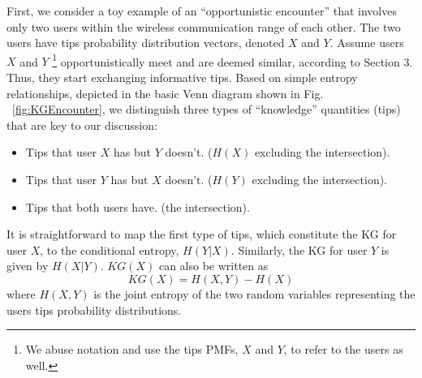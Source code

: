 \documentclass[conference]{IEEEtran}
\theoremstyle{definition}
\begin{document}
First, we consider a toy example of an ``opportunistic encounter'' that involves only two users within the wireless communication range of each other. The two users have tips probability distribution vectors, denoted $X$ and $Y$. Assume users $X$ and $Y$ \footnote{We abuse notation and use the tips PMFs, $X$ and $Y$, to refer to the users as well.} opportunistically meet and are deemed similar, according to Section 3. Thus, they start exchanging informative tips. Based on simple entropy relationships, depicted in the basic Venn diagram shown in Fig. ~\ref{fig:KGEncounter}, we distinguish three types of ``knowledge'' quantities (tips) that are key to our discussion: 
%
\begin{itemize}
\vspace{-0.2 cm}
\item Tips that user $X$ has but $Y$ doesn't. ($H(X)$ excluding the intersection).
\vspace{-0.2 cm}
\item Tips that user $Y$ has but $X$ doesn't. ($H(Y)$ excluding the intersection).
\vspace{-0.2 cm}
\item Tips that both users have. (the intersection).
\end{itemize}
It is straightforward to map the first type of tips, which constitute the KG for user $X$, 
to the conditional entropy, $H(Y|X)$. Similarly, the KG for user $Y$ is given by $H(X|Y)$.
$KG(X)$ can also be written as
%
\begin{equation}
KG(X) = H(X,Y) - H(X)
\end{equation}
where $H(X,Y)$ is the joint entropy of the two random variables representing the users tips probability distributions.
%
\end{document}
